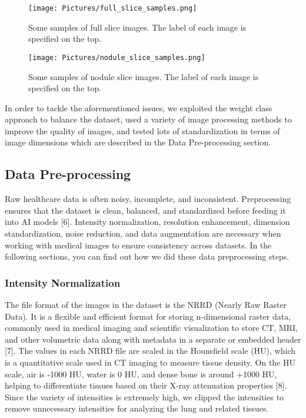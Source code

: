 \documentclass[a4paper, twocolumn, 11pt]{article}
\begin{document}
\begin{figure}[h!]
    \centering
    \texttt{[image: Pictures/full\_slice\_samples.png]}
    \caption{Some samples of full slice images. The label of each image is specified on the top.}
    \label{fig:Figure 4}
\end{figure}

\begin{figure}[h!]
    \centering
    \texttt{[image: Pictures/nodule\_slice\_samples.png]}
    \caption{Some samples of nodule slice images. The label of each image is specified on the top.}
    \label{fig:Figure 5}
\end{figure}

In order to tackle the aforementioned issues, we exploited the weight class approach to balance the dataset, used a variety of image processing methods to improve the quality of images, and tested lots of standardization in terms of image dimensions which are described in the Data Pre-processing section. 
\vspace{7pt}

\subsection{Data Pre-processing} 
Raw healthcare data is often noisy, incomplete, and inconsistent. Preprocessing ensures that the dataset is clean, balanced, and standardized before feeding it into AI models [6]. Intensity normalization, resolution enhancement, dimension standardization, noise reduction, and data augmentation are necessary when working with medical images to ensure consistency across datasets. In the following sections, you can find out how we did these data preprocessing steps.
\vspace{6pt}

\subsubsection{Intensity Normalization} 
The file format of the images in the dataset is the NRRD (Nearly Raw Raster Data). It is a flexible and efficient format for storing n-dimensional raster data, commonly used in medical imaging and scientific visualization to store CT, MRI, and other volumetric data along with metadata in a separate or embedded header [7]. The values in each NRRD file are scaled in the Hounsfield scale (HU), which is a quantitative scale used in CT imaging to measure tissue density. On the HU scale, air is -1000 HU, water is 0 HU, and dense bone is around +1000 HU, helping to differentiate tissues based on their X-ray attenuation properties [8]. Since the variety of intensities is extremely high, we clipped the intensities to remove unnecessary intensities for analyzing the lung and related tissues. 
\vspace{6pt}
\end{document}
